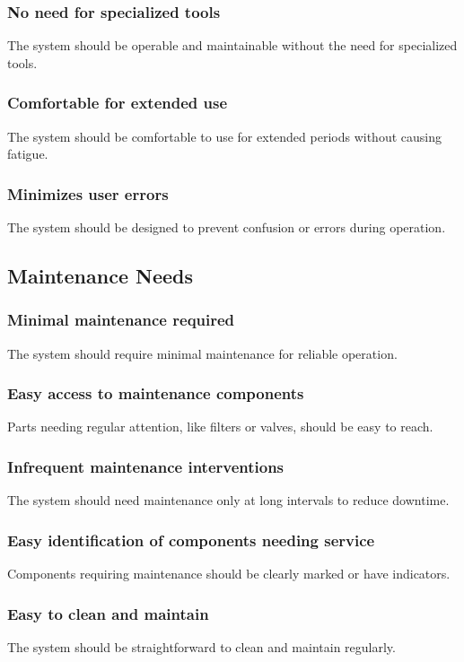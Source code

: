 \documentclass[12pt]{report}
\begin{document}
\subsubsection{No need for specialized tools}
The system should be operable and maintainable without the need for specialized tools.

\subsubsection{Comfortable for extended use}
The system should be comfortable to use for extended periods without causing fatigue.

\subsubsection{Minimizes user errors}
The system should be designed to prevent confusion or errors during operation.

\newpage
\subsection{Maintenance Needs}

\subsubsection{Minimal maintenance required}
The system should require minimal maintenance for reliable operation.

\subsubsection{Easy access to maintenance components}
Parts needing regular attention, like filters or valves, should be easy to reach.

\subsubsection{Infrequent maintenance interventions}
The system should need maintenance only at long intervals to reduce downtime.

\subsubsection{Easy identification of components needing service}
Components requiring maintenance should be clearly marked or have indicators.

\subsubsection{Easy to clean and maintain}
The system should be straightforward to clean and maintain regularly.
\end{document}
